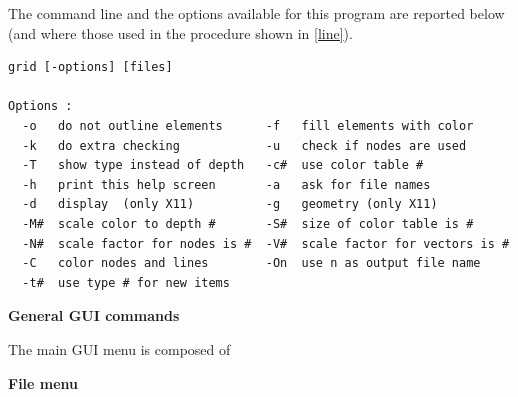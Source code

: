 The command line and the options available for this program are reported below (and where those used in the procedure shown in \Fig\ref{line}).

\begin{verbatim}
grid [-options] [files] 

Options :
  -o   do not outline elements      -f   fill elements with color     
  -k   do extra checking            -u   check if nodes are used      
  -T   show type instead of depth   -c#  use color table #            
  -h   print this help screen       -a   ask for file names           
  -d   display  (only X11)          -g   geometry (only X11)          
  -M#  scale color to depth #       -S#  size of color table is #     
  -N#  scale factor for nodes is #  -V#  scale factor for vectors is #
  -C   color nodes and lines        -On  use n as output file name    
  -t#  use type # for new items
\end{verbatim}

\textbf{General GUI commands}

\par
{}
\par
{}
\par
{}
\par
{}
\par

The main GUI menu is composed of

\par
{}\par
{}\par
{}\par
{}\par
{}\par
{}\par

\textbf{File menu}

\par
{}
\par
{}
\par
{}
\par
{}
\par

